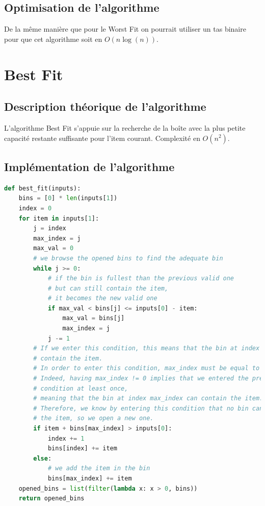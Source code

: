 \documentclass{article}
\begin{document}
\subsection{Optimisation de l'algorithme}
De la même manière que pour le Worst Fit on pourrait utiliser un tas binaire pour que cet algorithme soit en
$O(n\log(n))$.



\section{Best Fit}
\subsection{Description théorique de l'algorithme}
L'algorithme Best Fit s'appuie sur la recherche de la boîte avec la plus petite capacité restante suffisante pour l'item courant.
Complexité en $O(n^2)$.

\subsection{Implémentation de l'algorithme}
\begin{lstlisting}[language=Python, frame=single]
def best_fit(inputs):
    bins = [0] * len(inputs[1])
    index = 0
    for item in inputs[1]:
        j = index
        max_index = j
        max_val = 0
        # we browse the opened bins to find the adequate bin
        while j >= 0:
            # if the bin is fullest than the previous valid one
            # but can still contain the item,
            # it becomes the new valid one
            if max_val < bins[j] <= inputs[0] - item:
                max_val = bins[j]
                max_index = j
            j -= 1
        # If we enter this condition, this means that the bin at index max_index cannot
        # contain the item.
        # In order to enter this condition, max_index must be equal to 0.
        # Indeed, having max_index != 0 implies that we entered the precedent if
        # condition at least once,
        # meaning that the bin at index max_index can contain the item.
        # Therefore, we know by entering this condition that no bin can contain
        # the item, so we open a new one.
        if item + bins[max_index] > inputs[0]:
            index += 1
            bins[index] += item
        else:
            # we add the item in the bin
            bins[max_index] += item
    opened_bins = list(filter(lambda x: x > 0, bins))
    return opened_bins
\end{lstlisting}
\end{document}
